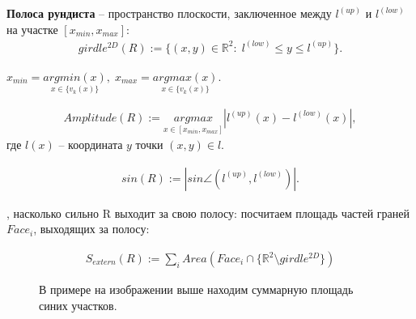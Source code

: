 \begin{definition}
	{\color{Black} \textbf{Полоса рундиста}} -- пространство плоскости, заключенное между $l^{(up)}$ и $l^{(low)}$ на участке $[x_{min}, x_{max}]$:
	$$\begin{gathered}
		girdle^{2D}(R):= \{ (x, y) \in \mathbb{R}^2: \; l^{(low)} \leq y \leq l^{(up)}\}.
	\end{gathered}$$
	\begin{figure}[h!]
	\end{figure}

\end{definition}

\begin{definition}
	$x_{min} = \underset{x \in \{ v_k(x) \}}{argmin(x)}, \; x_{max} = \underset{x \in \{ v_k(x) \}}{argmax(x)}$.
\end{definition}

\begin{definition}
	$$\begin{gathered}
		Amplitude(R) := \underset{x \in [x_{min}, x_{max}]}{argmax}|l^{(up)}(x) - l^{(low)}(x)|,
	\end{gathered}$$
	где $l(x)$ -- координата $y$ точки $(x, y) \in l$.

	\begin{figure}[h!]
	\end{figure}
\end{definition}\newpage

\begin{definition}
	$$\begin{gathered}
		sin(R) := |sin \angle (l^{(up)}, l^{(low)})|.
	\end{gathered}$$

\end{definition}

\begin{definition}
	, насколько сильно R выходит за свою полосу: посчитаем площадь частей граней $Face_i$, выходящих за полосу:

	$$\begin{gathered}
		S_{extern}(R) := \sum\limits_{i}Area(Face_i \cap \{ \mathbb{R}^2 \setminus girdle^{2D} \})
	\end{gathered}$$

	\begin{figure}[h!]
	\caption{В примере на изображении выше находим суммарную площадь синих участков.}
	\end{figure}

\end{definition}

